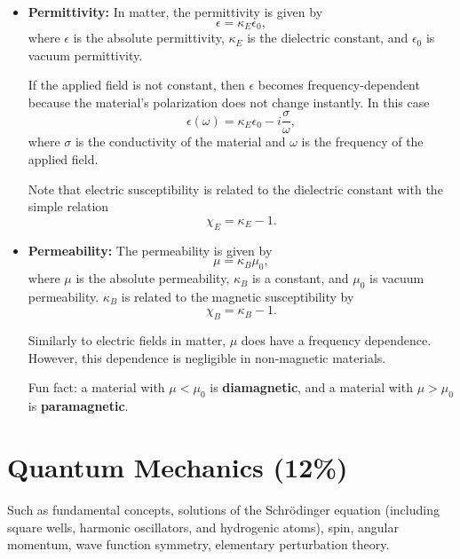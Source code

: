 \documentclass[%
 reprint,
superscriptaddress,
 amsmath,amssymb,
 aps,
prc,
]{revtex4-1}
\begin{document}
\begin{itemize}
	\item \textbf{Permittivity:} In matter, the permittivity is given by
	\begin{equation}
		\epsilon = \kappa_E \epsilon_0,
	\end{equation}
	where $\epsilon$ is the absolute permittivity, $\kappa_E$ is the dielectric constant, and $\epsilon_0$ is vacuum permittivity. 
	
	If the applied field is not constant, then $\epsilon$ becomes frequency-dependent because the material's polarization does not change instantly. In this case
	\begin{equation}
		\epsilon (\omega) = \kappa_E\epsilon_0 - i \frac{\sigma}{\omega},
	\end{equation}
	where $\sigma$ is the conductivity of the material and $\omega$ is the frequency of the applied field.
	
	Note that electric susceptibility is related to the dielectric constant with the simple relation
	\begin{equation}
		\chi_E = \kappa_E - 1.
	\end{equation} 
	
	\item \textbf{Permeability:} The permeability is given by
	\begin{equation}
		\mu = \kappa_B \mu_0,
	\end{equation}
	where $\mu$ is the absolute permeability, $\kappa_B$ is a constant, and $\mu_0$ is vacuum permeability. $\kappa_B$ is related to the magnetic susceptibility by
	\begin{equation}
		\chi_B = \kappa_B - 1.
	\end{equation}
	
	Similarly to electric fields in matter, $\mu$ does have a frequency dependence. However, this dependence is negligible in non-magnetic materials.
	
	Fun fact: a material with $\mu < \mu_0$ is \textbf{diamagnetic}, and a material with $\mu > \mu_0$ is \textbf{paramagnetic}.
\end{itemize}


\section{Quantum Mechanics (12\%)}
Such as fundamental concepts, solutions of the Schrödinger equation (including square wells, harmonic oscillators, and hydrogenic atoms), spin, angular momentum, wave function symmetry, elementary perturbation theory.
\end{document}
